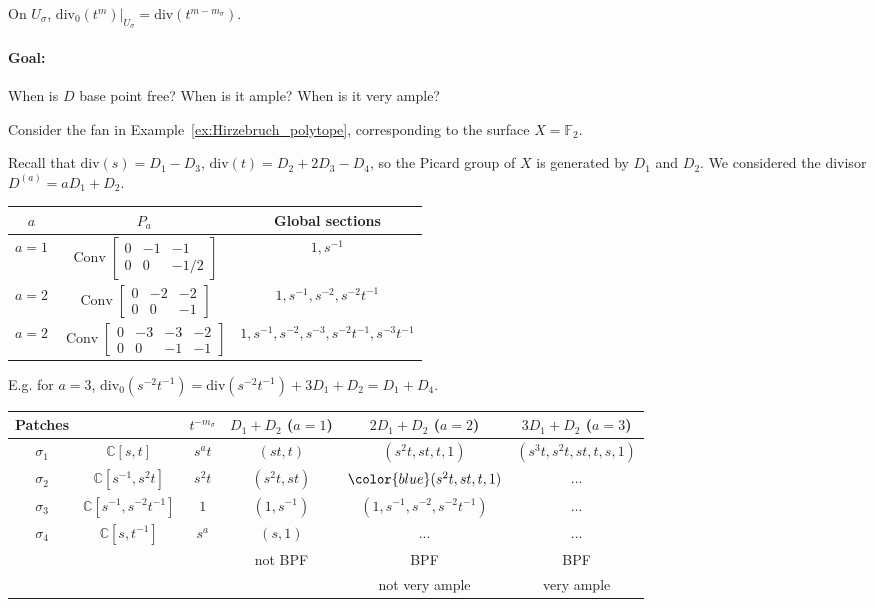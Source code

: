 \documentclass[a4paper,12pt]{amsart}
\newcommand{\CC}{\mathbb{C}}
\DeclareMathOperator{\Conv}{Conv}
\begin{document}
On $U_\sigma$, $\left. \text{div}_0(t^m) \right|_{U_\sigma} = \text{div}(t^{m-m_\sigma})$.

\paragraph{Goal:} When is $D$ base point free? When is it ample? When is it very ample?

\begin{example}\label{ex:BPF_F2}
Consider the fan in Example~\ref{ex:Hirzebruch_polytope}, corresponding to the surface $X = \mathbb{F}_2$.

Recall that $\text{div}(s) = D_1 - D_3$, $\text{div}(t) = D_2 + 2D_3 - D_4$, so the Picard group of $X$ is generated by $D_1$ and $D_2$. We considered the divisor $D^{(a)} = a D_1 + D_2$.
\begin{center}
\begin{tabular}{c|c|c}
$a$ & $P_a$ & Global sections \\ 
\hline 
$a=1$ & $\Conv \begin{bmatrix} 0 & -1 & -1 \\ 0 & 0 & -1/2 \end{bmatrix}$ & $1,s^{-1}$ \\ 
\hline 
$a=2$ & $\Conv \begin{bmatrix} 0 & -2 & -2 \\ 0 & 0 & -1 \end{bmatrix}$ & $1,s^{-1},s^{-2},s^{-2}t^{-1}$ \\ 
\hline 
$a=2$ & $\Conv \begin{bmatrix} 0 & -3 & -3 & -2 \\ 0 & 0 & -1 & -1 \end{bmatrix}$ & $1,s^{-1},s^{-2},s^{-3},s^{-2}t^{-1},s^{-3}t^{-1}$ \\ 
\end{tabular} 
\end{center}
E.g. for $a = 3$, $\text{div}_0(s^{-2}t^{-1}) = \text{div}(s^{-2}t^{-1}) + 3D_1+D_2 = D_1 + D_4$.
\begin{center}
\begin{tabular}{c|c|c|c|c|c}
Patches & & $t^{-m_\sigma}$ & $D_1+D_2$ ($a=1$) & $2D_1+D_2$ ($a=2$) & $3D_1+D_2$ ($a=3$) \\
\hline
$\sigma_1$ & $\CC[s,t]$ & $s^a t$ & $(st,t)$ & $(s^2t, st, t, 1)$ & $(s^3t,s^2t,st,t,s,1)$ \\
\hline
$\sigma_2$ & $\CC[s^{-1},s^{2}t]$ & $s^2 t$ & $(s^2t,st)$ & ${\color{blue}(s^2t,st,t,1)}$ & ...\\
\hline
$\sigma_3$ & $\CC[s^{-1},s^{-2}t^{-1}]$ & $1$ & $(1,s^{-1})$ & $(1,s^{-1},s^{-2},s^{-2}t^{-1})$ & ... \\
\hline
$\sigma_4$ & $\CC[s,t^{-1}]$ & $s^a$ & $(s,1)$ & ... & ... \\
\hline
&&& not BPF & BPF & BPF \\
&&&& not very ample & very ample
\end{tabular}
\end{center}


\end{example}
\end{document}
